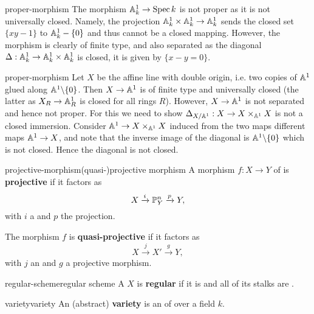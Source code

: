 \begin{example}{proper-morphism}
    The morphism $\AA_k^1 \to \Spec k$ is not proper as it is not universally closed. Namely, the projection $\AA^1_k \times \AA^1_k \to \AA^1_k$ sends the closed set $\{ xy - 1 \}$ to $\AA^1_k - \{ 0 \}$ and thus cannot be a closed mapping. However, the morphism is clearly of finite type, and also separated as the diagonal $\Delta : \AA^1_k \to \AA^1_k \times \AA^1_k$ is closed, it is given by $\{ x - y = 0 \}$.
\end{example}

\begin{example}{proper-morphism}
    Let $X$ be the affine line with double origin, i.e. two copies of $\AA^1$ glued along $\AA^1 \backslash \{ 0 \}$. Then $X \to \AA^1$ is of finite type and universally closed (the latter as $X_R \to \AA^1_R$ is closed for all rings $R$). However, $X \to \AA^1$ is not separated and hence not proper. For this we need to show $\Delta_{X / \AA^1} : X \to X \times_{\AA^1} X$ is not a closed immersion. Consider $\AA^1 \to X \times_{\AA^1} X$ induced from the two maps different maps $\AA^1 \to X$, and note that the inverse image of the diagonal is $\AA^1 \backslash \{ 0 \}$ which is not closed. Hence the diagonal is not closed.
\end{example}

\begin{topic}{projective-morphism}{(quasi-)projective morphism}
    A morphism $f : X \to Y$ of  is \textbf{projective} if it factors as
    \[ X \xrightarrow{i} \PP^n_Y \xrightarrow{p} Y , \]
    with $i$ a  and $p$ the projection.
    
    The morphism $f$ is \textbf{quasi-projective} if it factors as
    \[ X \xrightarrow{j} X' \xrightarrow{g} Y , \]
    with $j$ an  and $g$ a projective morphism.
\end{topic}

\begin{topic}{regular-scheme}{regular scheme}
    A  $X$ is \textbf{regular} if it is  and all of its stalks are .
\end{topic}

\begin{topic}{variety}{variety}
    An (abstract) \textbf{variety} is an    of  over a field $k$.
\end{topic}

